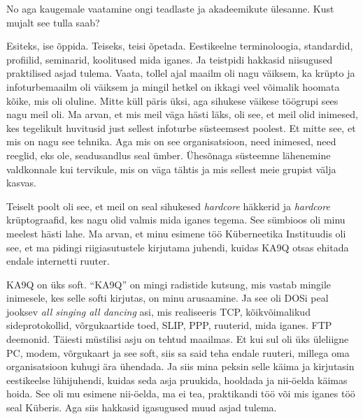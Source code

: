 No aga kaugemale vaatamine ongi teadlaste ja akadeemikute ülesanne. Kust mujalt 
see tulla saab? 


Esiteks, ise õppida. Teiseks, teisi õpetada. Eestikeelne terminoloogia, 
standardid, profiilid, seminarid, koolitused mida iganes.  Ja  teistpidi 
hakkasid niisugused praktilised asjad tulema. Vaata, tollel ajal maailm oli 
nagu väiksem, ka krüpto ja infoturbemaailm oli väiksem ja mingil hetkel on 
ikkagi veel võimalik hoomata  kõike, mis oli oluline. Mitte küll päris üksi, 
aga sihukese väikese töögrupi sees nagu meil oli. Ma arvan, et mis meil  väga 
hästi läks, oli see, et meil olid inimesed, kes  tegelikult  huvitusid just  
sellest infoturbe süsteemsest poolest. Et mitte see, et mis on nagu see 
tehnika. Aga mis on see organisatsioon, need inimesed, need reeglid, eks ole, 
seadusandlus seal ümber. Ühesõnaga süsteemne lähenemine valdkonnale kui 
tervikule, mis on  väga tähtis ja  mis sellest meie grupist välja kasvas. 

Teiselt poolt oli see, et meil on seal sihukesed \emph{hardcore} häkkerid ja 
\emph{hardcore} krüptograafid, kes nagu olid valmis mida iganes tegema. See 
sümbioos oli minu meelest hästi lahe. Ma arvan, et minu esimene töö 
Küberneetika Instituudis oli see, et ma pidingi riigiasutustele kirjutama 
juhendi, kuidas KA9Q otsas ehitada endale internetti ruuter. 


KA9Q on üks soft. \enquote{KA9Q} on mingi radistide kutsung, mis vastab mingile 
inimesele, kes selle softi kirjutas, on minu arusaamine. Ja see oli DOSi peal 
jooksev \emph{all singing all dancing} asi, mis realiseeris TCP, kõikvõimalikud 
sideprotokollid, võrgukaartide toed, SLIP, PPP, ruuterid, mida iganes. FTP 
deemonid. Täiesti müstilisi asju on tehtud maailmas.  Et kui sul oli üks  
üleliigne PC, modem, võrgukaart ja see soft, siis sa said teha endale ruuteri, 
millega oma organisatsioon kuhugi ära ühendada. Ja siis mina peksin selle käima 
ja kirjutasin eestikeelse lühijuhendi, kuidas seda asja  pruukida, hooldada ja 
nii-öelda käimas hoida. See oli mu esimene nii-öelda, ma ei tea, praktikandi 
töö või mis iganes töö seal Küberis. Aga siis hakkasid igasugused muud asjad
tulema.

